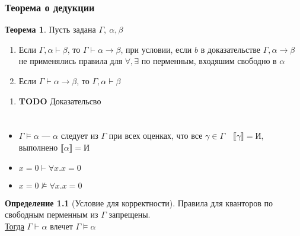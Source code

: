 \documentclass[oneside]{book}
\theoremstyle{plain}
\theoremstyle{remark}
\theoremstyle{definition}
\newtheorem{theorem}{Теорема}[section]
\newtheorem*{definition}{Определение}
\begin{document}
\subsection{Теорема о дедукции}
\label{sec:org589dd3b}
\begin{theorem}
Пусть задана \(\Gamma,\ \alpha,\beta\)
\begin{enumerate}
\item Если \(\Gamma, \alpha \vdash \beta\), то \(\Gamma \vdash \alpha \to \beta\), при условии, если \(b\) в доказательстве \(\Gamma, \alpha \to \beta\) не применялись правила для \(\forall, \exists\) по перменным, входяшим свободно в \(\alpha\)
\item Если \(\Gamma \vdash \alpha \to \beta\), то \(\Gamma, \alpha \vdash \beta\)
\end{enumerate}
\end{theorem}
\begin{enumerate}
\item {\bfseries\sffamily TODO} Доказательсво
\label{sec:org3adc0c5}
\end{enumerate}
\chapter{}
\label{sec:org82dded2}
\begin{itemize}
\item \(\Gamma \vDash \alpha\) --- \(\alpha\) следует из \(\Gamma\) при всех оценках, что все \(\gamma \in \Gamma\quad \llbracket \gamma \rrbracket = \text{И}\), выполнено \(\llbracket \alpha \rrbracket = \text{И}\)
\item \(x = 0 \vdash \forall x. x = 0\)
\item \(x = 0 \not\vDash \forall x. x = 0\)
\end{itemize}
\begin{definition}[Условие для корректности]
Правила для кванторов по свободным перменным из \(\Gamma\) запрещены. \\
\uline{Тогда} \(\Gamma \vdash \alpha\) влечет \(\Gamma \vDash \alpha\)
\end{definition}
\end{document}
